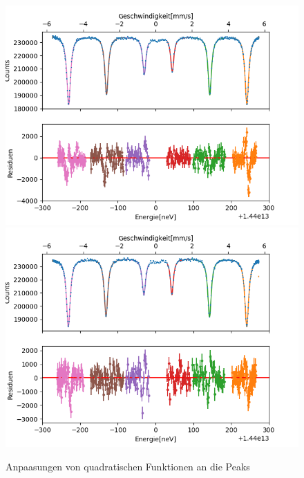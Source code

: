 \documentclass[12pt,a4paper]{article}
\begin{document}
\begin{figure}
\centering
\includegraphics[scale=0.9]{Bilder/Hyperfein/Hyper_fit_vor.png}
\includegraphics[scale=0.9]{Bilder/Hyperfein/Hyper_fit_nach.png}
\caption{Anpaasungen von quadratischen Funktionen an die Peaks}
\label{fig:Hyper_fit}
\end{figure}
\end{document}
